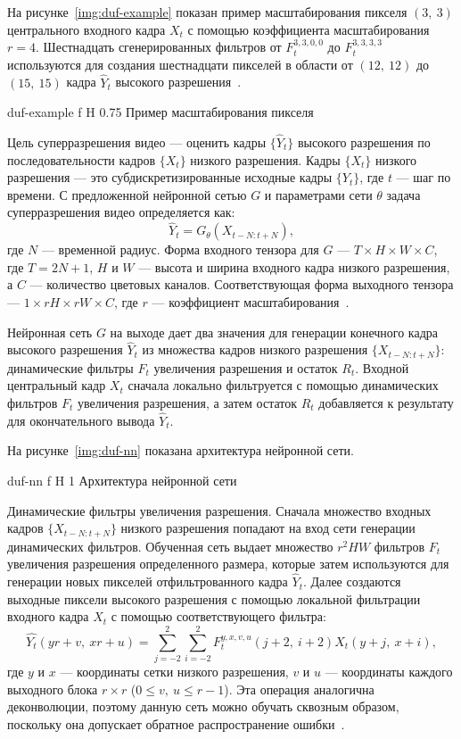 \documentclass{bmstu}
\begin{document}
На рисунке~\ref{img:duf-example} показан пример масштабирования пикселя $(3,~3)$ центрального входного кадра $X_t$ с помощью коэффициента масштабирования $r = 4$. 
Шестнадцать сгенерированных фильтров от $F^{3,3,0,0}_t$ до $F^{3,3,3,3}_t$ используются для создания шестнадцати пикселей в области от $(12,~12)$ до $(15,~15)$ кадра $\hat{Y}_t$ высокого разрешения~\cite{Younghyun2018}.

    {duf-example}
    {f}
    {H}
    {0.75\textwidth}
    {Пример масштабирования пикселя~\cite{Younghyun2018}}
    
Цель суперразрешения видео --- оценить кадры $\{\hat{Y}_t\}$ высокого разрешения по последовательности кадров $\{X_t\}$ низкого разрешения. 
Кадры $\{X_t\}$ низкого разрешения --- это субдискретизированные исходные кадры $\{Y_t\}$, где $t$ --- шаг по времени. 
С предложенной нейронной сетью $G$ и параметрами сети $\theta$ задача суперразрешения видео определяется как:
\begin{equation}
\hat{Y}_t = G_\theta(X_{t - N:t + N}),
\end{equation}
где $N$ --- временной радиус. 
Форма входного тензора для $G$ --- $T \times H \times W \times C$, где $T = 2N + 1$, $H$ и $W$ --- высота и ширина входного кадра низкого разрешения, а $C$ --- количество цветовых каналов. 
Соответствующая форма выходного тензора --- $1 \times rH \times rW \times C$, где $r$ --- коэффициент масштабирования~\cite{Younghyun2018}.

Нейронная сеть $G$ на выходе дает два значения для генерации конечного кадра высокого разрешения $\hat{Y}_t$ из множества кадров низкого разрешения $\{X_{t - N:t + N}\}$: динамические фильтры $F_t$ увеличения разрешения и остаток $R_t$. 
Входной центральный кадр $X_t$ сначала локально фильтруется с помощью динамических фильтров $F_t$ увеличения разрешения, а затем остаток $R_t$ добавляется к результату для окончательного вывода $\hat{Y}_t$.

На рисунке~\ref{img:duf-nn} показана архитектура нейронной сети. 

    {duf-nn}
    {f}
    {H}
    {1\textwidth}
    {Архитектура нейронной сети~\cite{Younghyun2018}}
    
Динамические фильтры увеличения разрешения. 
Сначала множество входных кадров $\{X_{t - N:t + N}\}$ низкого разрешения попадают на вход сети генерации динамических фильтров. 
Обученная сеть выдает множество $r^{2}HW$ фильтров $F_t$ увеличения разрешения определенного размера, которые затем используются для генерации новых пикселей отфильтрованного кадра $\hat{Y}_t$. 
Далее создаются выходные пиксели высокого разрешения с помощью локальной фильтрации входного кадра $X_t$ с помощью соответствующего фильтра:
\begin{equation}
\hat{Y_t}(yr + v,~xr + u) = \sum_{j = -2}^{2} \sum_{i = -2}^{2} F^{y,x,v,u}_{t}(j + 2,~i + 2)X_{t}(y + j,~x + i),
\end{equation}
где $y$ и $x$ --- координаты сетки низкого разрешения, $v$ и $u$ --- координаты каждого выходного блока $r \times r$ ($0 \leq v,~u \leq r - 1$). 
Эта операция аналогична деконволюции, поэтому данную сеть можно обучать сквозным образом, поскольку она допускает обратное распространение ошибки~\cite{Younghyun2018}.
\end{document}
